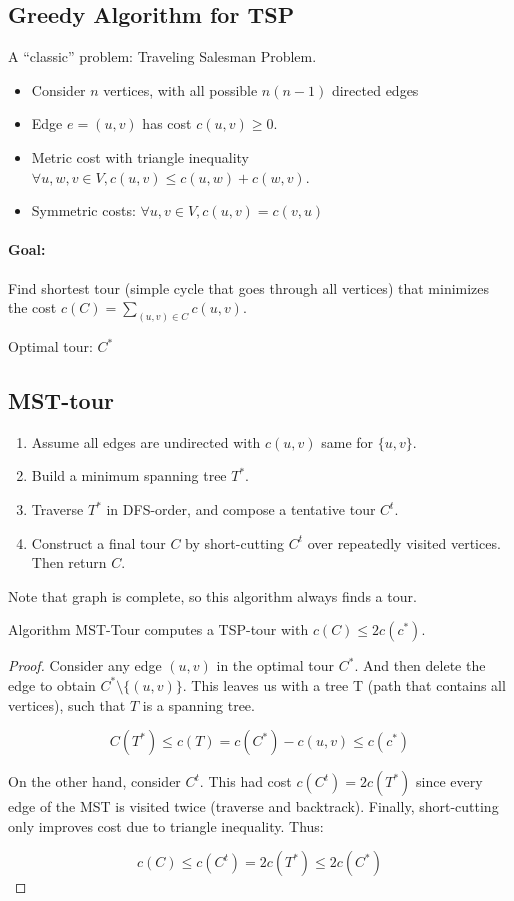 \subsection{Greedy Algorithm for TSP}

A ``classic'' problem: Traveling Salesman Problem.

\begin{itemize}
\item Consider $n$ vertices, with all possible $n(n-1)$ directed edges
\item Edge $e = (u,v)$ has cost $c(u,v) \ge 0$.
\item Metric cost with triangle inequality $\forall u,w,v \in V, c(u,v) \le c(u,w) + c(w,v)$.
\item Symmetric costs: $\forall u,v \in V, c(u,v) = c(v,u)$
\end{itemize}

\paragraph{Goal:} Find shortest tour (simple cycle that goes through all vertices) that minimizes the cost $c(C) = \sum\limits_{(u,v) \in C} c(u,v)$.

Optimal tour: $C^*$

\subsection{MST-tour}

\begin{enumerate}
\item Assume all edges are undirected with $c(u,v)$ same for $\{u,v\}$.
\item Build a minimum spanning tree $T^*$.
\item Traverse $T^*$ in DFS-order, and compose a tentative tour $C^t$.
\item Construct a final tour $C$ by short-cutting $C^t$ over repeatedly visited vertices. Then return $C$.
\end{enumerate}

Note that graph is complete, so this algorithm always finds a tour.

\begin{mytheorem}
Algorithm MST-Tour computes a TSP-tour with $c(C) \le 2 c(c^*)$.
\end{mytheorem}
\begin{proof}
Consider any edge $(u,v)$ in the optimal tour $C^*$. And then delete the edge to obtain $C^* \setminus \{(u,v)\}$. This leaves us with a tree T (path that contains all vertices), such that $T$ is a spanning tree.

$$C(T^*) \le c(T) = c(C^*) - c(u,v) \le c(c^*)$$

On the other hand, consider $C^t$. This had cost $c(C^t) = 2c(T^*)$ since every edge of the MST is visited twice (traverse and backtrack). Finally, short-cutting only improves cost due to triangle inequality. Thus:

$$c(C) \le c(C^t) = 2c(T^*) \le 2c(C^*)$$
\end{proof}

